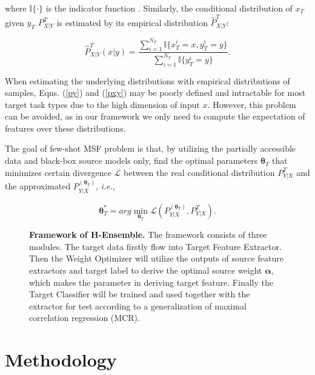 \documentclass[letterpaper]{article} %
\begin{document}
\noindent where $\mathbb{I}\{\cdot\}$ is the indicator function \citep{feller1991introduction}. Similarly, the conditional distribution of $x_T$ given $y_T$ $P^T_{X|Y}$ is estimated by its empirical distribution $\hat P^T_{X|Y}$:

\begin{equation}
\hat P^T_{X|Y} (x|y)= \frac{\sum_{i=1}^{N_T}\mathbb{I}\{x_T^i=x,y_T^i=y\}}{\sum_{i=1}^{N_T}\mathbb{I}\{y_T^i=y\}}.   
\label{pxy}
\end{equation}

When estimating the underlying distributions with empirical distributions of samples, Eqns. (\ref{py}) and (\ref{pxy}) may be poorly defined and intractable for most target task types due to the high dimension of input $x$. However, this problem can be avoided, as in our framework we only need to compute the expectation of features over these distributions.

The goal of few-shot MSF problem is that, by utilizing the partially accessible data and black-box source models only, find the optimal parameters $\boldsymbol{\theta}_T$ that minimizes certain divergence $\mathcal L$ between the real conditional distribution $P^T_{Y|X}$ and the approximated $P^{(\boldsymbol{\theta}_T)}_{Y|X}$, \textit{i.e.},

\begin{equation}
    \boldsymbol{\theta}^*_T = arg\min_{\boldsymbol{\theta}_T} \mathcal L(P^{(\boldsymbol{\theta}_T)}_{Y|X}, P^T_{Y|X}).
    \label{definition}
\end{equation}

\begin{figure*}
    \centering
    \centerline{}
    \caption{\textbf{Framework of H-Ensemble.} The framework consists of three modules. The target data firstly flow into Target Feature Extractor. Then the Weight Optimizer will utilize the outputs of source feature extractors and target label to derive the optimal source weight $\boldsymbol{\alpha}$, which makes the parameter in deriving target feature. Finally the Target Classifier will be trained and used together with the extractor for test according to a generalization of maximal correlation regression (MCR).}
    \label{fig:framework}
\end{figure*}



\section{Methodology}
\end{document}
